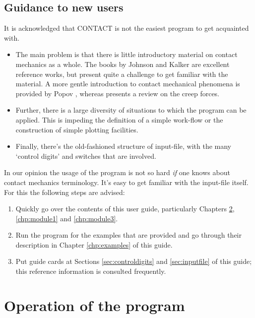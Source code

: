 \documentclass[12pt]{report}
\begin{document}
\section{Guidance to new users}

It is acknowledged that CONTACT is not the easiest program to get acquainted
with.
\begin{itemize}
\item The main problem is that there is little introductory material on
contact mechanics as a whole. The books by Johnson \cite{Johnson1985} and
Kalker \cite{Kalker1990} are excellent reference works, but present quite a
challenge to get familiar with the material. A more gentle introduction to
contact mechanical phenomena is provided by Popov \cite{Popov2010a-book},
whereas \cite{Vollebregt2021a-soa-paper} presents a review on the
creep forces. 
\item Further, there is a large diversity of situations to which the program
can be applied. This is impeding the definition of a simple work-flow or
the construction of simple plotting facilities.
\item Finally, there's the old-fashioned structure of input-file, with the
many `control digits' and switches that are involved.
\end{itemize}
In our opinion the usage of the program is not so hard {\em if\/} one knows
about contact mechanics terminology. It's easy to get familiar with the
input-file itself. For this the following steps are advised:
\begin{enumerate}
\item Quickly go over the contents of this user guide, particularly
Chapters \ref{chp:operation}, \ref{chp:module1} and \ref{chp:module3}.
\item Run the program for the examples that are provided and go through
their description in Chapter \ref{chp:examples} of this guide.
\item Put guide cards at Sections \ref{sec:controldigits} and
\ref{sec:inputfile} of this guide; this reference information is consulted
frequently.
\end{enumerate}


\chapter{Operation of the program}
\label{chp:operation}
\end{document}
